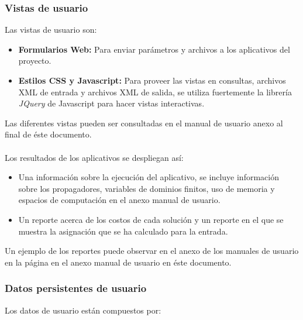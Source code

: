 \subsubsection{Vistas de usuario} \label{sec:vistasUsuario}

Las vistas de usuario son:

\begin{itemize}
	\item \textbf{Formularios Web:} Para enviar parámetros y archivos a los aplicativos del proyecto.
	\item \textbf{Estilos CSS y Javascript:} Para proveer las vistas en consultas, archivos XML de entrada y archivos XML de salida, se utiliza fuertemente la librería \textit{JQuery} de Javascript para hacer vistas interactivas.
\end{itemize}
Las diferentes vistas pueden ser consultadas en el manual de usuario anexo al final de éste documento.
\\\\
Los resultados de los aplicativos se despliegan así:

\begin{itemize}
	\item Una información sobre la ejecución del aplicativo, se incluye información sobre los propagadores, variables de dominios finitos, uso de memoria y espacios de computación en el anexo manual de usuario.
	\item Un reporte acerca de los costos de cada solución y un reporte en el que se muestra la asignación que se ha calculado para la entrada.
\end{itemize}

Un ejemplo de los reportes puede observar en el anexo de los manuales de usuario en la página \pageref{manual:aplicativo} en el anexo manual de usuario en éste documento.

\subsubsection{Datos persistentes de usuario}

Los datos de usuario están compuestos por:

